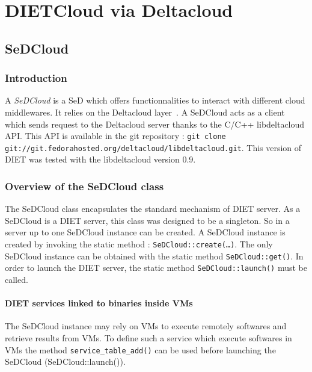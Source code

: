 

\chapter{DIETCloud via Deltacloud}\label{chapter:Deltacloud}




\section{SeDCloud}

\subsection{Introduction}

A \emph{SeDCloud} is a SeD which offers functionnalities to interact with
different cloud middlewares. It relies on the Deltacloud
layer~\cite{Deltacloud}.  A SeDCloud acts as a client which sends
request to the Deltacloud server thanks to the C/C++ libdeltacloud
API. This API is available in the git repository : \texttt{git clone
  git://git.fedorahosted.org/deltacloud/libdeltacloud.git}.
This version of DIET was tested with the libdeltacloud version 0.9.

\subsection{Overview of the SeDCloud class}

The SeDCloud class encapsulates the standard mechanism of DIET server.
As a SeDCloud is a DIET server, this class was designed to be a
singleton. So in a server up to one SeDCloud instance can be created.
A SeDCloud instance is created by invoking the static method :
\texttt{SeDCloud::create(\ldots)}.  The only SeDCloud instance can be
obtained with the static method \texttt{SeDCloud::get()}.  In order to
launch the DIET server, the static method \texttt{SeDCloud::launch()}
must be called.

\subsubsection{DIET services linked to binaries inside VMs}

The SeDCloud instance may rely on VMs to execute remotely softwares and
retrieve results from VMs. To define such a service which execute
softwares in VMs the method \texttt{service\_table\_add()} can be used
before launching the SeDCloud (SeDCloud::launch()).

